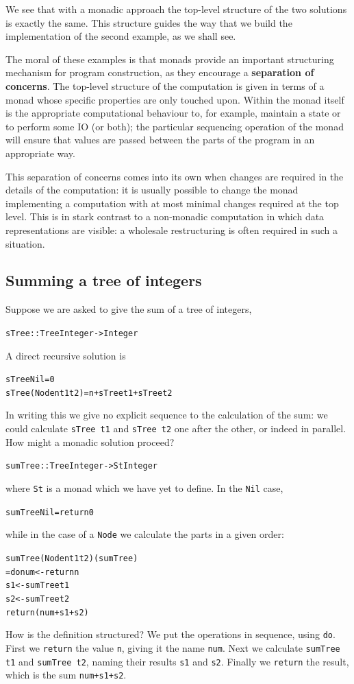 We see that with a monadic approach the top-level
structure of the two solutions 
is exactly the same. This structure guides the way that we build the
implementation of the second example, as we shall see.

The moral of these examples is
that monads provide an important structuring mechanism for program
construction, as they encourage a \textbf{separation of concerns}. The
top-level structure of the computation is given in terms of a
monad whose specific properties are only touched upon. Within the monad itself
is the appropriate computational behaviour to, for example, 
maintain a state or to perform some
IO (or both); the particular sequencing operation of the monad will
ensure that values are passed between the parts of the program in an
appropriate way.

This separation of concerns comes into its own when changes are required
in the details of the computation: it is usually possible to change the monad
implementing a computation with at most minimal changes required at the
top level. This is in stark contrast to a non-monadic computation in
which data representations are visible: a wholesale restructuring is
often required in such a situation.

\subsection*{Summing a tree of integers}

Suppose we are asked to give the sum of a tree of integers,
\begin{alltt}
sTree :: Tree Integer -> Integer
\end{alltt}
A direct recursive solution is
\begin{alltt}
sTree Nil            = 0
sTree (Node n t1 t2) = n + sTree t1 + sTree t2
\end{alltt}
In writing this we give no explicit sequence to the calculation of the sum: we
could calculate \texttt{sTree t1} and \texttt{sTree t2} one after the other, or
indeed in parallel. How might a monadic solution proceed?
\begin{alltt}
sumTree :: Tree Integer -> St Integer
\end{alltt}
where \texttt{St} is a monad which we have yet to define. In the \texttt{Nil} case,
\begin{alltt}
sumTree Nil = return 0
\end{alltt}
while in the case of a \texttt{Node} we calculate the parts in a given order:
\begin{alltt}
sumTree (Node n t1 t2)\hfill(sumTree)\label{sumTree}
  = do num <- return n
       s1  <- sumTree t1
       s2  <- sumTree t2
       return (num + s1 + s2)
\end{alltt}
How is the definition structured? We put the operations in sequence, using
\texttt{do}. First we \texttt{return} the value \texttt{n}, giving it the 
name \texttt{num}. Next we calculate \texttt{sumTree t1} and \texttt{sumTree t2}, naming 
their results \texttt{s1} and \texttt{s2}. Finally we \texttt{return} the result, which
is the sum \texttt{num+s1+s2}. 

